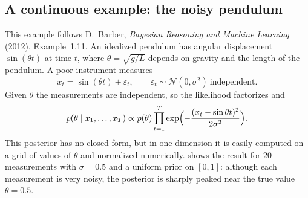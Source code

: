 \begin{notechapter}
\section{A continuous example: the noisy pendulum}\label{bayesian-reasoning:sec:pendulum}

This example follows D.~Barber, \emph{Bayesian Reasoning and Machine Learning}
(2012), Example~1.11. An idealized pendulum has angular displacement $\sin(\theta t)$ at time
$t$, where $\theta = \sqrt{g/L}$ depends on gravity and the length of the
pendulum. A poor instrument measures
\[
  x_t = \sin(\theta t) + \varepsilon_t,\qquad\varepsilon_t\sim\mathcal N(0,\sigma^2)\ \text{independent}.
\]
Given $\theta$ the measurements are independent, so the likelihood factorizes and
\[
  p(\theta\mid x_1,\dots,x_T)\propto p(\theta)\prod_{t=1}^T\exp\Bigl(-\frac{(x_t - \sin\theta t)^2}{2\sigma^2}\Bigr).
\]
This posterior has no closed form, but in one dimension it is easily computed on
a grid of values of $\theta$ and normalized numerically.
 shows the result for $20$ measurements with
$\sigma = 0.5$ and a uniform prior on $[0,1]$: although each measurement is very
noisy, the posterior is sharply peaked near the true value $\theta = 0.5$.


\end{notechapter}

